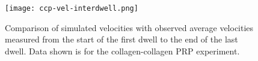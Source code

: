 \documentclass{article}
\begin{document}
\begin{figure}
  \centering
  \texttt{[image: ccp-vel-interdwell.png]}
  \caption{Comparison of simulated velocities with observed average
    velocities measured from the start of the first dwell to the end
    of the last dwell. Data shown is for the collagen-collagen PRP
    experiment.}
  \label{fig:ccp-vel-interdwell}
\end{figure}



\end{document}
